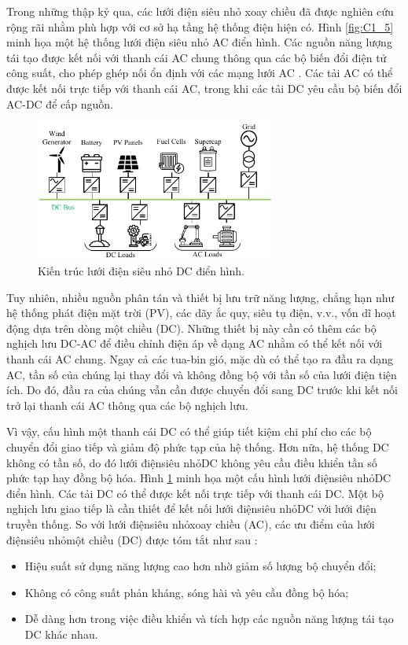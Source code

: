 Trong những thập kỷ qua, các lưới điện siêu nhỏ xoay chiều đã được nghiên cứu rộng rãi nhằm phù hợp với cơ sở hạ tầng hệ thống điện hiện có. Hình \ref{fig:C1_5} minh họa một hệ thống lưới điện siêu nhỏ AC điển hình. Các nguồn năng lượng tái tạo được kết nối với thanh cái AC chung thông qua các bộ biến đổi điện tử công suất, cho phép ghép nối ổn định với các mạng lưới AC \cite{justo2013ac}. Các tải AC có thể được kết nối trực tiếp với thanh cái AC, trong khi các tải DC yêu cầu bộ biến đổi AC-DC để cấp nguồn.\par
\begin{figure}
    \centering
    \includegraphics[width=0.7\textwidth]{Figures/Content_Pages/Chapter_1/C1_6.pdf}
    \caption{Kiến trúc lưới điện siêu nhỏ DC điển hình.}
    \label{fig:C1_6}
\end{figure}
Tuy nhiên, nhiều nguồn phân tán và thiết bị lưu trữ năng lượng, chẳng hạn như hệ thống phát điện mặt trời (PV), các dãy ắc quy, siêu tụ điện, v.v., vốn dĩ hoạt động dựa trên dòng một chiều (DC). Những thiết bị này cần có thêm các bộ nghịch lưu DC-AC để điều chỉnh điện áp về dạng AC nhằm có thể kết nối với thanh cái AC chung. Ngay cả các tua-bin gió, mặc dù có thể tạo ra đầu ra dạng AC, tần số của chúng lại thay đổi và không đồng bộ với tần số của lưới điện tiện ích. Do đó, đầu ra của chúng vẫn cần được chuyển đổi sang DC trước khi kết nối trở lại thanh cái AC thông qua các bộ nghịch lưu.\par
Vì vậy, cấu hình một thanh cái DC có thể giúp tiết kiệm chi phí cho các bộ chuyển đổi giao tiếp và giảm độ phức tạp của hệ thống. Hơn nữa, hệ thống DC không có tần số, do đó lưới điệnsiêu nhỏDC không yêu cầu điều khiển tần số phức tạp hay đồng bộ hóa. Hình \ref{fig:C1_6} minh họa một cấu hình lưới điệnsiêu nhỏDC điển hình. Các tải DC có thể được kết nối trực tiếp với thanh cái DC. Một bộ nghịch lưu giao tiếp là cần thiết để kết nối lưới điệnsiêu nhỏDC với lưới điện truyền thống.
So với lưới điệnsiêu nhỏxoay chiều (AC), các ưu điểm của lưới điệnsiêu nhỏmột chiều (DC) được tóm tắt như sau \cite{justo2013ac}\cite{lotfi2015ac}:\par
\begin{itemize}
    \item Hiệu suất sử dụng năng lượng cao hơn nhờ giảm số lượng bộ chuyển đổi;
    \item Không có công suất phản kháng, sóng hài và yêu cầu đồng bộ hóa;
    \item Dễ dàng hơn trong việc điều khiển và tích hợp các nguồn năng lượng tái tạo DC khác nhau.
\end{itemize}
